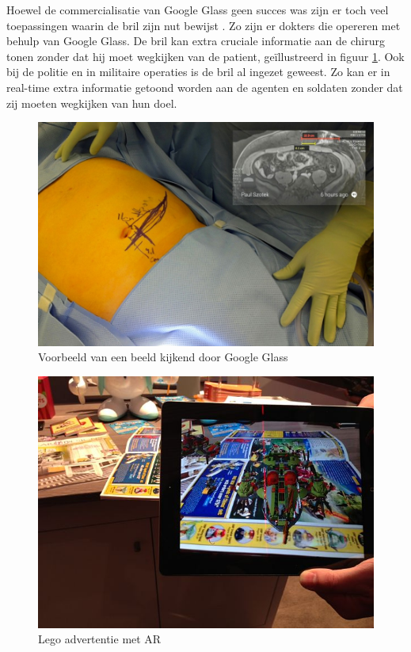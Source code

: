 \documentclass[pdftex,a4paper,12pt,twoside]{report}
\begin{document}
Hoewel de commercialisatie van Google Glass geen succes was zijn er toch veel toepassingen waarin de bril zijn nut bewijst \citep{ggUses}. Zo zijn er dokters die opereren met behulp van Google Glass. De bril kan extra cruciale informatie aan de chirurg tonen zonder dat hij moet wegkijken van de patient, ge\"illustreerd in figuur \ref{fig:googleAan}. Ook bij de politie en in militaire operaties is de bril al ingezet geweest. Zo kan er in real-time extra informatie getoond worden aan de agenten en soldaten zonder dat zij moeten wegkijken van hun doel. \\


\begin{figure}[H]
\begin{center}
\includegraphics[scale=0.30]{googleIn.jpg}	
\end{center}
\caption{Voorbeeld van een beeld kijkend door Google Glass \citep{ggFotoIn}} \label{fig:googleAan}
\end{figure}


\begin{figure}
\vspace{-5pt}
\includegraphics[scale=0.22]{lego.jpg}
\caption{Lego advertentie met AR\citep{legoFoto}} \label{fig:lego}

\end{figure}
\end{document}
